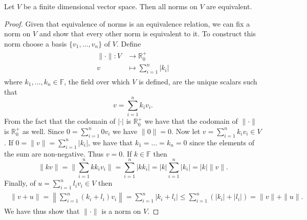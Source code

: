 \begin{theorem}
	Let $V$ be a finite dimensional vector space. Then all norms on $V$ are equivalent.
\end{theorem}

\begin{proof}
	Given that equivalence of norms is an equivalence relation, we can fix a norm on $V$ and show that every other norm is equivalent to it. To construct this norm choose a basis $\{v_1,\dots,v_n\}$ of $V$. Define
	\begin{align}
	\begin{split}
		\|\cdot\|:V&\rightarrow\mathbb{R}^+_0\\
		v&\mapsto\sum_{i=1}^n|k_i|
	\end{split}
	\end{align}
where $k_1,\dots,k_n\in\mathbb{F}$, the field over which $V$ is defined, are the unique scalars such that
	\begin{equation}
		v=\sum_{i=1}^n k_iv_i.
	\end{equation}	 
From the fact that the codomain of $|\cdot|$ is $\mathbb{R}^+_0$ we have that the codomain of $\|\cdot\|$ is $\mathbb{R}^+_0$ as well. Since $0=\sum_{i=1}^n0v_i$ we have $\|0\|=0$. Now let $v=\sum_{i=1}^nk_iv_i\in V$. If $0=\|v\|=\sum_{i=1}^n |k_i|$, we have that $k_1=\dots=k_n=0$ since the elements of the sum are non-negative. Thus $v =0$. If $k\in\mathbb{F}$ then
	\begin{equation}
		\|kv\|=\|\sum_{i=1}^nkk_iv_i\|=\sum_{i=1}^n|kk_i|=|k|\sum_{i=1}^n|k_i|=|k|\|v\|.
	\end{equation}
Finally, of $u=\sum_{i=1}^n l_iv_i\in V$ then
	\begin{align}
	\begin{split}
		\|v+u\|=\left\lVert\sum_{i=1}^n(k_i+l_i)v_i\right\rVert=\sum_{i=1}^n|k_i+l_i|\leq\sum_{i=1}^n(|k_i|+|l_i|)=\|v\|+\|u\|.
	\end{split}
	\end{align}
We have thus show that $\|\cdot\|$ is a norm on $V$.


\end{proof}

